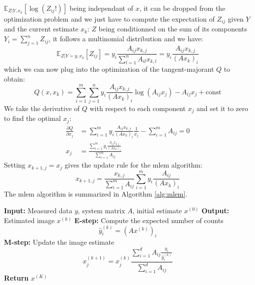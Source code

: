 $\mathbb{E}_{Z|Y, x_k}[\log(Z_{ij}!)]$ being independant of $x$, it can be dropped from the optimization problem and we just have to compute the expectation of $Z_{ij}$ given $Y$ and the current estimate $x_k$:
$Z$ being conditionned on the sum of its components $Y_i = \sum_{j=1}^{n} Z_{ij}$, it follows a multinomial distribution and we have:
\begin{equation}
    \mathbb{E}_{Z|Y=y, x_k}[Z_{ij}] = y_i \frac{A_{ij} x_{k,j}}{\sum_{l=1}^{n} A_{il} x_{k,l}} = y_i \frac{A_{ij} x_{k,j}}{(Ax_k)_i}
\end{equation}
which we can now plug into the optimization of the tangent-majorant $Q$ to obtain:
\begin{equation}
    Q(x, x_k) = \sum_{i=1}^{m} \sum_{j=1}^{n} y_i \frac{A_{ij} x_{k,j}}{(Ax_k)_i} \log(A_{ij} x_j) - A_{ij} x_j + \text{const}
\end{equation}
We take the derivative of $Q$ with respect to each component $x_j$ and set it to zero to find the optimal $x_j$:
\begin{align}
    \frac{\partial Q}{\partial x_j} &= \sum_{i=1}^{m} y_i \frac{A_{ij} x_{k,j}}{(Ax_k)_i} \frac{1}{x_j} - \sum_{i=1}^{m} A_{ij} = 0 \\
    x_j &= \frac{\sum_{i=1}^{m} y_i \frac{A_{ij} x_{k,j}}{(Ax_k)_i}}{\sum_{i=1}^{m} A_{ij}}
\end{align}
Setting $x_{k+1,j} = x_j$ gives the update rule for the \acrshort{mlem} algorithm:
\begin{equation}
    x_{k+1,j} = \frac{x_{k,j}}{\sum_{i=1}^{m} A_{ij}} \sum_{i=1}^{m} y_i \frac{A_{ij}}{(Ax_k)_i}
\end{equation}
The \acrshort{mlem} algorithm is summarized in Algorithm \ref{alg:mlem}.
\begin{algorithm}
    \caption{Maximum-Likelihood Expectation-Maximization (MLEM)}
    \begin{algorithmic}[1]
    \State \textbf{Input:} Measured data $y$, system matrix $A$, initial estimate $x^{(0)}$
    \State \textbf{Output:} Estimated image $x^{(k)}$
        \State \textbf{E-step:} Compute the expected number of counts
        \begin{equation*}
            \hat{y}_i^{(k)} = (Ax^{(k)})_i
        \end{equation*}
        \State \textbf{M-step:} Update the image estimate
        \begin{equation*}
            x_j^{(k+1)} = x_j^{(k)} \frac{\sum_{i=1}^{d} A_{ij} \frac{y_i}{\hat{y}_i^{(k)}}}{\sum_{i=1}^{d} A_{ij}}
        \end{equation*}
    \EndFor
    \State \textbf{Return} $x^{(K)}$
    \end{algorithmic}
    \label{alg:mlem}
\end{algorithm}
